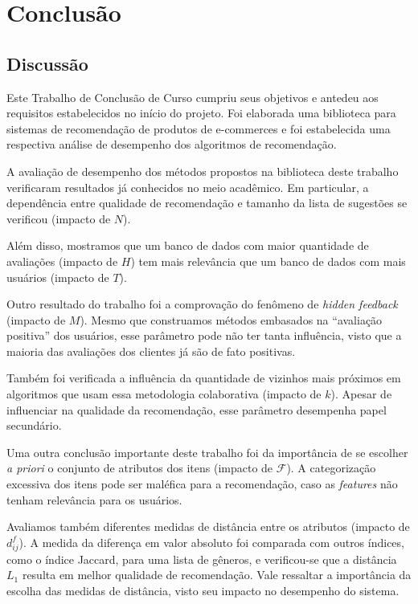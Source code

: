\chapter{Conclusão}
\label{cha:trabalhos_futuros}

\section{Discussão} %
\label{sec:discuss_o}

Este Trabalho de Conclusão de Curso cumpriu seus objetivos e antedeu aos requisitos estabelecidos no início do projeto. Foi elaborada uma biblioteca para sistemas de recomendação de produtos de e-commerces e foi estabelecida uma respectiva análise de desempenho dos algoritmos de recomendação.

A avaliação de desempenho dos métodos propostos na biblioteca deste trabalho verificaram resultados já conhecidos no meio acadêmico. Em particular, a dependência entre qualidade de recomendação e tamanho da lista de sugestões se verificou (impacto de $N$). 

Além disso, mostramos que um banco de dados com maior quantidade de avaliações (impacto de $H$) tem mais relevância que um banco de dados com mais usuários (impacto de $T$). 

Outro resultado do trabalho foi a comprovação do fenômeno de \textit{hidden feedback} (impacto de $M$). Mesmo que construamos métodos embasados na ``avaliação positiva'' dos usuários, esse parâmetro pode não ter tanta influência, visto que a maioria das avaliações dos clientes já são de fato positivas.

Também foi verificada a influência da quantidade de vizinhos mais próximos em algoritmos que usam essa metodologia colaborativa (impacto de $k$). Apesar de influenciar na qualidade da recomendação, esse parâmetro desempenha papel secundário.

Uma outra conclusão importante deste trabalho foi da importância de se escolher \textit{a priori} o conjunto de atributos dos itens (impacto de $\mathcal{F}$). A categorização excessiva dos itens pode ser maléfica para a recomendação, caso as \textit{features} não tenham relevância para os usuários.

Avaliamos também diferentes medidas de distância entre os atributos (impacto de $d_{ij}^f$). A medida da diferença em valor absoluto foi comparada com outros índices, como o índice Jaccard, para uma lista de gêneros, e verificou-se que a distância $L_1$ resulta em melhor qualidade de recomendação. Vale ressaltar a importância da escolha das medidas de distância, visto seu impacto no desempenho do sistema.

